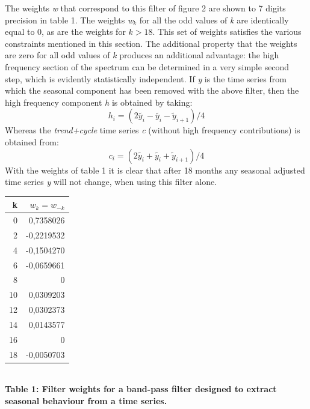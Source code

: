 \documentclass{article}
\begin{document}
The weights \textit{w} that correspond to this filter of figure 2 are shown to 7 digits precision in table 1. The weights \textit{w$_k$} for all the odd values of \textit{k} are identically equal to 0, as are the weights for $ k>18$. This set of weights satisfies the various constraints mentioned in this section. The additional property that the weights are zero for all odd values of\textit{ k} produces an additional advantage: the high frequency section of the spectrum can be determined in a very simple second step, which is evidently statistically independent. If \textit{y} is the time series from which the seasonal component has been removed with the above filter, then the high frequency component \textit{h} is obtained by taking:
\begin{equation}
h_i = (2 \tilde{y_i} - \tilde{y_i} - \tilde{y}_{i+1})/4
\end{equation}
Whereas the \textit{trend+cycle} time series \textit{c} (without high frequency contributions) is obtained from:
\begin{equation}
c_i = (2\tilde{y_i}+\tilde{y_i}+\tilde{y}_{i+1})/4
\end{equation}
With the weights of table 1 it is clear that after 18 months any seasonal adjusted time series \textit{y} will not change, when using this filter alone.
\begin{table}[h!]
\centering
\begin{tabular}{r r}
k & $w_k=w_{-k}$\\
\hline
0 & 0,7358026\\
2 & -0,2219532\\
4 & -0,1504270\\
6 & -0,0659661\\
8 & 0\\
10 & 0,0309203\\
12 & 0,0302373\\
14 & 0,0143577\\
16 & 0\\
18 & -0,0050703\\
\hline
\end{tabular}
\end{table}
\\{\textbf{\scriptsize Table 1: Filter weights for a band-pass filter designed to extract seasonal behaviour from a time series.}}
\bigskip
\end{document}
